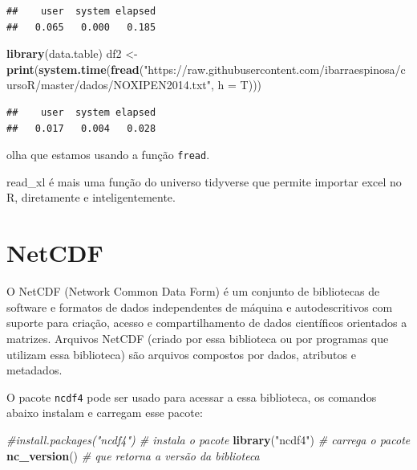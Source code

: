 \documentclass[]{book}
\newenvironment{Shaded}{\begin{snugshade}}{\end{snugshade}}
\newcommand{\KeywordTok}[1]{\textcolor[rgb]{0.13,0.29,0.53}{\textbf{#1}}}
\newcommand{\DataTypeTok}[1]{\textcolor[rgb]{0.13,0.29,0.53}{#1}}
\newcommand{\StringTok}[1]{\textcolor[rgb]{0.31,0.60,0.02}{#1}}
\newcommand{\CommentTok}[1]{\textcolor[rgb]{0.56,0.35,0.01}{\textit{#1}}}
\newcommand{\NormalTok}[1]{#1}
\begin{document}
\begin{verbatim}
##    user  system elapsed 
##   0.065   0.000   0.185
\end{verbatim}

\begin{Shaded}
\begin{Highlighting}[]
\KeywordTok{library}\NormalTok{(data.table)}
\NormalTok{df2 <-}\StringTok{ }\KeywordTok{print}\NormalTok{(}\KeywordTok{system.time}\NormalTok{(}\KeywordTok{fread}\NormalTok{(}\StringTok{"https://raw.githubusercontent.com/ibarraespinosa/cursoR/master/dados/NOXIPEN2014.txt"}\NormalTok{, }\DataTypeTok{h =}\NormalTok{ T)))}
\end{Highlighting}
\end{Shaded}

\begin{verbatim}
##    user  system elapsed 
##   0.017   0.004   0.028
\end{verbatim}

olha que estamos usando a função \texttt{fread}.

read\_xl é mais uma função do universo tidyverse que permite importar
excel no R, diretamente e inteligentemente.

\section{NetCDF}\label{netcdf}

O NetCDF (Network Common Data Form) é um conjunto de bibliotecas de
software e formatos de dados independentes de máquina e autodescritivos
com suporte para criação, acesso e compartilhamento de dados científicos
orientados a matrizes. Arquivos NetCDF (criado por essa biblioteca ou
por programas que utilizam essa biblioteca) são arquivos compostos por
dados, atributos e metadados.

O pacote \texttt{ncdf4} pode ser usado para acessar a essa biblioteca,
os comandos abaixo instalam e carregam esse pacote:

\begin{Shaded}
\begin{Highlighting}[]
\CommentTok{#install.packages("ncdf4") # instala o pacote}
\KeywordTok{library}\NormalTok{(}\StringTok{"ncdf4"}\NormalTok{)          }\CommentTok{# carrega o pacote}
\KeywordTok{nc_version}\NormalTok{()              }\CommentTok{# que retorna a versão da biblioteca}
\end{Highlighting}
\end{Shaded}
\end{document}

